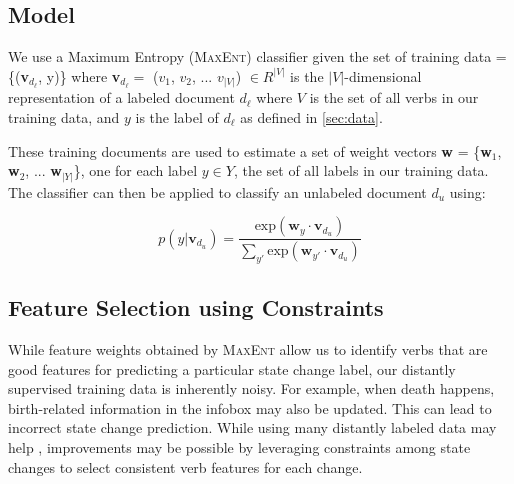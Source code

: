 
\subsection{Model}
We use a Maximum Entropy (\textsc{MaxEnt}) classifier given the set of training data = \{(\textbf{v}$_{d_{\ell}}$, y)\} where \textbf{v}$_{d_{\ell}} =$ ($v_1$, $v_2$, ... $v_{|V|}$) $\in R^{|V|}$ is the $|V|$-dimensional representation of a labeled document $d_{\ell}$ where $V$ is the set of all verbs in our training data, and $y$ is the label of $d_{\ell}$ as defined in \ref{sec:data}.

These training documents are used to estimate a set of weight vectors \textbf{w} = \{\textbf{w}$_1$, \textbf{w}$_2$, ... \textbf{w}$_{|Y|}$\}, one for each label $y \in Y$, the set of all labels in our training data. The classifier can then be applied to classify an unlabeled document $d_{\textit{u}}$ using: 

 \begin{equation}
	p(y|\textbf{v}_{d_{\textit{u}}}) = \frac{\mathrm{exp}  (\textbf{w}_{y} \cdot \textbf{v}_{d_{\textit{u}}})}{\sum_{y'} \mathrm{exp} (\textbf{w}_{y'} \cdot \textbf{v}_{d_{\textit{u}}})} \label{eqn:maxent}
\end{equation}

\subsection{Feature Selection using Constraints}

While feature weights obtained by \textsc{MaxEnt} allow us to identify verbs that are good features for predicting a particular state change label, our distantly supervised training data is inherently noisy. %
For example, when death happens, birth-related information in the infobox may also be updated. This can lead to incorrect state change prediction. While using many distantly labeled data may help%
, improvements may be possible by leveraging constraints among state changes to select consistent verb features for each change. 

